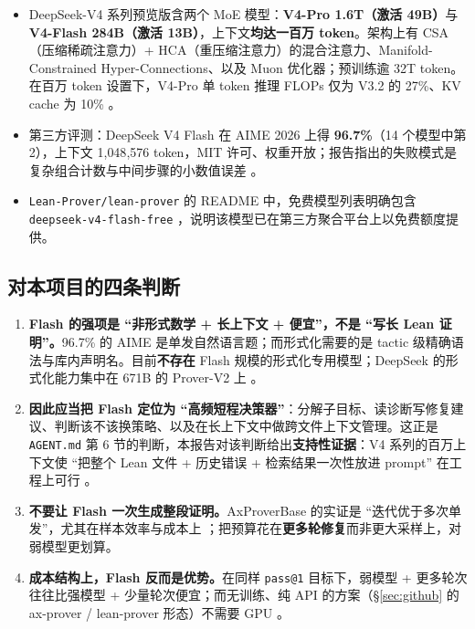 \documentclass[UTF8,a4paper,11pt,fontset=windows]{ctexart}
\newcommand{\code}[1]{\texttt{#1}}
\begin{document}
\begin{itemize}
  \item DeepSeek-V4 系列预览版含两个 MoE 模型：\textbf{V4-Pro 1.6T（激活 49B）}与 \textbf{V4-Flash 284B（激活 13B）}，上下文\textbf{均达一百万 token}。架构上有 CSA（压缩稀疏注意力）+ HCA（重压缩注意力）的混合注意力、Manifold-Constrained Hyper-Connections、以及 Muon 优化器；预训练逾 32T token。在百万 token 设置下，V4-Pro 单 token 推理 FLOPs 仅为 V3.2 的 27\%、KV cache 为 10\% \cite{deepseekv4}。
  \item 第三方评测：DeepSeek V4 Flash 在 AIME 2026 上得 \textbf{96.7\%}（14 个模型中第 2），上下文 1{,}048{,}576 token，MIT 许可、权重开放；报告指出的失败模式是复杂组合计数与中间步骤的小数值误差 \cite{layerlens}。
  \item \code{Lean-Prover/lean-prover} 的 README 中，免费模型列表明确包含 \texttt{deepseek-v4-flash-free} \cite{leanproverrepo}，说明该模型已在第三方聚合平台上以免费额度提供。
\end{itemize}

\subsection{对本项目的四条判断}

\begin{enumerate}
  \item \textbf{Flash 的强项是 ``非形式数学 + 长上下文 + 便宜''，不是 ``写长 Lean 证明''。}96.7\% 的 AIME 是单发自然语言题；而形式化需要的是 tactic 级精确语法与库内声明名。目前\textbf{不存在} Flash 规模的形式化专用模型；DeepSeek 的形式化能力集中在 671B 的 Prover-V2 上 \cite{dsprov2}。
  \item \textbf{因此应当把 Flash 定位为 ``高频短程决策器''}：分解子目标、读诊断写修复建议、判断该不该换策略、以及在长上下文中做跨文件上下文管理。这正是 \code{AGENT.md} 第 6 节的判断，本报告对该判断给出\textbf{支持性证据}：V4 系列的百万上下文使 ``把整个 Lean 文件 + 历史错误 + 检索结果一次性放进 prompt'' 在工程上可行 \cite{deepseekv4}。
  \item \textbf{不要让 Flash 一次生成整段证明。}AxProverBase 的实证是 ``迭代优于多次单发''，尤其在样本效率与成本上 \cite{axprover}；把预算花在\textbf{更多轮修复}而非更大采样上，对弱模型更划算。
  \item \textbf{成本结构上，Flash 反而是优势。}在同样 \code{pass@1} 目标下，弱模型 + 更多轮次往往比强模型 + 少量轮次便宜；而无训练、纯 API 的方案（\S\ref{sec:github} 的 ax-prover / lean-prover 形态）不需要 GPU \cite{axprover,leanproverrepo}。
\end{enumerate}
\end{document}
